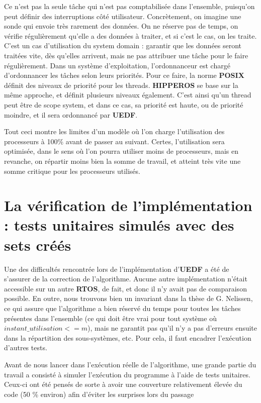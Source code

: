 	Ce n'est pas la seule tâche qui n'est pas comptabilisée dans l'ensemble, puisqu'on peut définir des 
	interruptions côté utilisateur. 
	Concrètement, on imagine une sonde qui envoie très rarement des données. On ne réserve 
	pas de temps, on vérifie régulièrement qu'elle a des données à traiter, et si c'est le cas, on les traite.\\
	C'est un cas d'utilisation du system domain : garantir que les données seront traitées vite, dès qu'elles arrivent, 
	mais ne pas attribuer une tâche pour le faire régulièrement.
	Dans un système d'exploitation, l'ordonnanceur est chargé d'ordonnancer les tâches selon leurs priorités. 
	Pour ce faire, la norme \textbf{POSIX} définit des niveaux de priorité pour les threads. 
	\textbf{HIPPEROS }se base sur la même approche, et définit plusieurs niveaux également. C'est ainsi 
	qu'un thread peut être de scope system, et dans ce cas, sa priorité est haute, ou de priorité 
	moindre, et il sera ordonnancé par \textbf{UEDF}.\newline
	
	Tout ceci montre les limites d'un modèle où l'on charge l'utilisation des processeurs à 100\% avant de 
	passer au suivant. Certes, l'utilisation sera optimisée, dans le sens où l'on 
	pourra utiliser moins de processeurs, mais en revanche, on 
	répartir moins bien la somme de travail, et atteint très vite une somme critique pour les processeurs utilisés.

\section{La vérification de l'implémentation : tests unitaires simulés avec des sets créés}

	Une des difficultés rencontrée lors de l'implémentation d'\textbf{UEDF} a été de s'assurer de la correction de l'algorithme. 
	Aucune autre implémentation n'était accessible sur un autre \textbf{RTOS}, de fait, et donc il n'y avait pas de 
	comparaison possible. En outre, nous trouvons bien un invariant dans la thèse de G. Nelissen, ce qui assure 
	que l'algorithme a bien réservé du temps pour toutes les tâches présentes dans l'ensemble 
	(ce qui doit être vrai pour tout système où $instant\_utilisation <= m$), mais ne garantit pas 
	qu'il n'y a pas d'erreurs ensuite dans la répartition des sous-systèmes, etc. Pour cela, il faut encadrer 
	l'exécution d'autres tests. \newline

	Avant de nous lancer dans l'exécution réelle de l'algorithme, une grande partie du travail a consisté 
	à simuler l'exécution du programme à l'aide de tests unitaires. Ceux-ci ont été pensés de sorte à avoir 
	une couverture relativement élevée du code (50 \% environ) afin d'éviter les surprises lors du passage 
	

